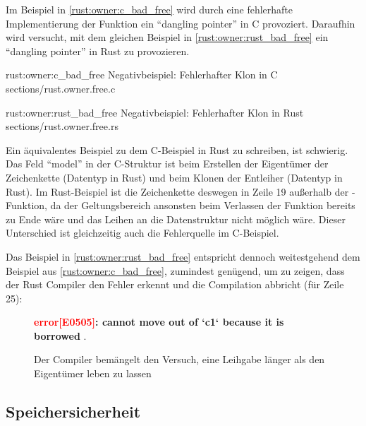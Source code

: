 Im Beispiel in \autoref{rust:owner:c_bad_free} wird durch eine fehlerhafte Implementierung der Funktion  ein \enquote{dangling pointer} in C provoziert.
Daraufhin wird versucht, mit dem gleichen Beispiel in \autoref{rust:owner:rust_bad_free} ein \enquote{dangling pointer} in Rust zu provozieren.



\ccinclude
	{rust:owner:c_bad_free}
	{Negativbeispiel: Fehlerhafter Klon in C}
	{sections/rust.owner.free.c}

\rustcinclude
	{rust:owner:rust_bad_free}
	{Negativbeispiel: Fehlerhafter Klon in Rust}
	{sections/rust.owner.free.rs}

Ein äquivalentes Beispiel zu dem C-Beispiel in Rust zu schreiben, ist schwierig.
Das Feld \enquote{model} in der C-Struktur ist beim Erstellen der Eigentümer der Zeichenkette (Datentyp  in Rust) und beim Klonen der Entleiher (Datentyp  in Rust).
Im Rust-Beispiel ist die Zeichenkette deswegen in Zeile 19 außerhalb der -Funktion, da der Geltungsbereich ansonsten beim Verlassen der Funktion bereits zu Ende wäre und das Leihen an die Datenstruktur nicht möglich wäre.
Dieser Unterschied ist gleichzeitig auch die Fehlerquelle im C-Beispiel.

Das Beispiel in \autoref{rust:owner:rust_bad_free} entspricht dennoch weitestgehend dem Beispiel aus \autoref{rust:owner:c_bad_free}, zumindest genügend, um zu zeigen, dass der Rust Compiler den Fehler erkennt und die Compilation abbricht (für Zeile 25):

\begin{figure}[H]
	\begin{tcolorbox}[colback=codeBackground,boxrule=0pt,arc=0pt]
		\begin{scriptsize}
			\textbf{\textcolor{red}{error[E0505]}: cannot move out of `c1` because it is borrowed} .
		\end{scriptsize}
	\end{tcolorbox}
	\caption{Der Compiler bemängelt den Versuch, eine Leihgabe länger als den Eigentümer leben zu lassen}
	\label{rust:rustc:error:no_dangling_pointer}
\end{figure}


\subsection{Speichersicherheit}
\label{rust:guarantee:memory_safety}


